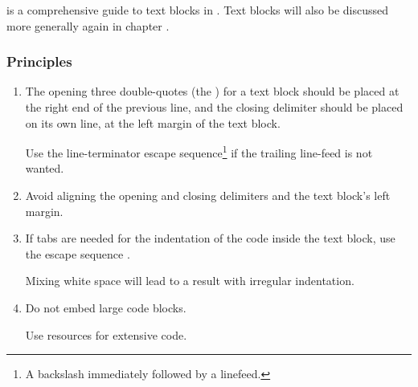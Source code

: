  \autocite{Laskey:TextBlocks} is a comprehensive guide to text blocks in \Java. Text blocks will also be discussed more generally again in chapter .

\subsubsection{Principles}
\begin{enumerate}[label=P\arabic*.]
\item{The opening three double-quotes (the ) for a text block should be placed at the right end of the previous line, and the closing delimiter should be placed on its own line, at the left margin of the text block.

Use the line-terminator escape sequence\footnote{A backslash immediately followed by a linefeed.} if the trailing line-feed is not wanted.}
\item{Avoid aligning the opening and closing delimiters and the text block's left margin.}
\item{If tabs are needed for the indentation of the code inside the text block, use the escape sequence \bdq{\lstinline|\\t|}. 

Mixing white space will lead to a result with irregular indentation.}
\item{Do not embed large code blocks.

Use resources for extensive code.}
\end{enumerate}




